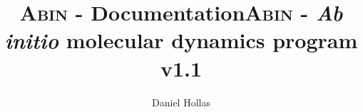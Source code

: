 \documentclass[12pt,a4paper]{article}
\author{Daniel Hollas}
\title{\textsc{Abin} - Documentation}
\title{\textsc{Abin} -  \textit{Ab initio} molecular dynamics program \\ v1.1}
\begin{document}
\maketitle

\newcommand{\abin}{\textsc{Abin} }

\tableofcontents
\newpage



\clearpage


\clearpage


\clearpage


\clearpage



\clearpage


\end{document}
